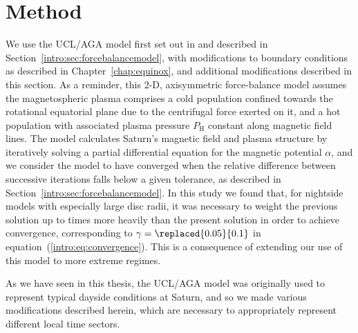 \section{Method}\label{LTsectors:sec:method}
We use the UCL/AGA model first set out in \citet{achilleos2010a, achilleos2010b} and described in Section~\ref{intro:sec:forcebalancemodel}, with modifications to boundary conditions as described in Chapter~\ref{chap:equinox}, and additional modifications described in this section. As a reminder, this 2-D, axisymmetric force-balance model assumes the magnetospheric plasma comprises a cold population confined towards the rotational equatorial plane due to the centrifugal force exerted on it, and a hot population with associated plasma pressure $P_\mathrm{H}$ constant along magnetic field lines. The model calculates Saturn's magnetic field and plasma structure by iteratively solving a partial differential equation for the magnetic potential $\alpha$, and we consider the model to have converged when the relative difference between successive iterations falls below a given tolerance, as described in Section~\ref{intro:sec:forcebalancemodel}. In this study we found that, for nightside models with especially large disc radii, it was necessary to weight the previous solution up to  times more heavily than the present solution in order to achieve convergence, corresponding to $\gamma=\replaced{0.05}{0.1}$ in equation~(\ref{intro:eq:convergence}). This is a consequence of extending our use of this model to more extreme regimes.

As we have seen in this thesis, the UCL/AGA model was originally used to represent typical dayside conditions at Saturn, and so we made various modifications described herein, which are necessary to appropriately represent different local time sectors.

